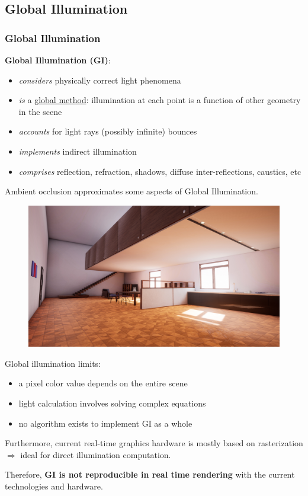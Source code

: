\documentclass{beamer}
\begin{document}
\subsection{Global Illumination}
\begin{frame}[allowframebreaks]
\frametitle{Global Illumination}
\textbf{Global Illumination (GI)}:
\begin{itemize}
    \item \emph{considers} physically correct light phenomena
    \item \emph{is} a \underline{global method}: illumination at each point is a function of other geometry in the scene
    \item \emph{accounts} for light rays (possibly infinite) bounces
    \item \emph{implements} indirect illumination
    \item \emph{comprises} reflection, refraction, shadows, diffuse inter-reflections, caustics, etc
\end{itemize}

Ambient occlusion approximates some aspects of Global Illumination.

\framebreak
\begin{figure}
    \centering
    \includegraphics[width=0.9\linewidth]{images/gi_room.jpg}
\end{figure}
\framebreak
Global illumination limits:
\begin{itemize}
    \item a pixel color value depends on the entire scene
    \item light calculation involves solving complex equations
    \item no algorithm exists to implement GI as a whole
\end{itemize}

Furthermore, current real-time graphics hardware is mostly based on rasterization $ \Rightarrow $ ideal for direct illumination computation.

Therefore, \textbf{GI is not reproducible in real time rendering} with the current technologies and hardware.
\end{frame}
\end{document}
